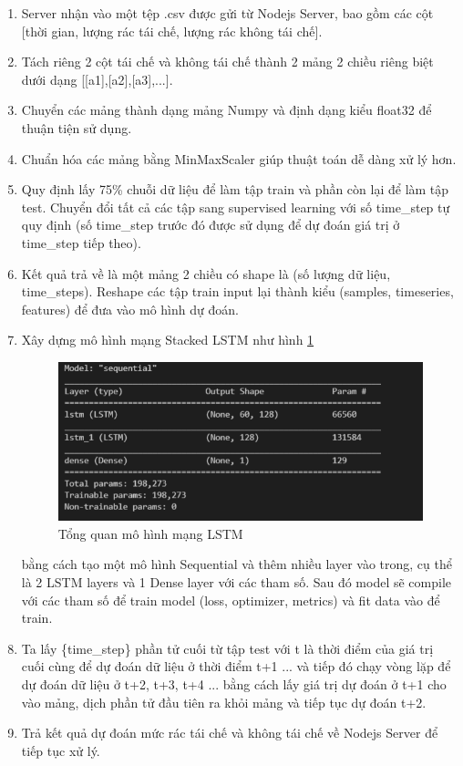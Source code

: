 \begin{enumerate}
    \item Server nhận vào một tệp .csv được gửi từ Nodejs Server, bao gồm các cột [thời gian, lượng rác tái chế, lượng rác không tái chế]. 
    \item Tách riêng 2 cột tái chế và không tái chế thành 2 mảng 2 chiều riêng biệt dưới dạng [[a1],[a2],[a3],...].
    \item Chuyển các mảng thành dạng mảng Numpy và định dạng kiểu float32 để thuận tiện sử dụng.
    \item Chuẩn hóa các mảng bằng MinMaxScaler giúp thuật toán dễ dàng xử lý hơn.
    \item Quy định lấy 75\% chuỗi dữ liệu để làm tập train và phần còn lại để làm tập test. Chuyển đổi tất cả các tập sang supervised learning với số time\_step tự quy định (số time\_step trước đó được sử dụng để dự đoán giá trị ở time\_step tiếp theo).
    \item Kết quả trả về là một mảng 2 chiều có shape là (số lượng dữ liệu, time\_steps). Reshape các tập train input lại thành kiểu (samples, timeseries, features) để đưa vào mô hình dự đoán.
    \item Xây dựng mô hình mạng Stacked LSTM như hình \ref{fig:lstm_model}
    \begin{figure}[H]
        \centering
        \includegraphics[width=\textwidth]{images/Khanh/Python/LSTM Model.PNG}
        \caption{Tổng quan mô hình mạng LSTM}
        \label{fig:lstm_model}
    \end{figure}
    bằng cách tạo một mô hình Sequential và thêm nhiều layer vào trong, cụ thể là 2 LSTM layers và 1 Dense layer với các tham số. Sau đó model sẽ compile với các tham số để train model (loss, optimizer, metrics) và fit data vào để train.
    \item Ta lấy \{time\_step\} phần tử cuối từ tập test với t là thời điểm của giá trị cuối cùng để dự đoán dữ liệu ở thời điểm t+1 ... và tiếp đó chạy vòng lặp để dự đoán dữ liệu ở t+2, t+3, t+4 ... bằng cách lấy giá trị dự đoán ở t+1 cho vào mảng, dịch phần tử đầu tiên ra khỏi mảng và tiếp tục dự đoán t+2.
    \item Trả kết quả dự đoán mức rác tái chế và không tái chế về Nodejs Server để tiếp tục xử lý. 
\end{enumerate}

